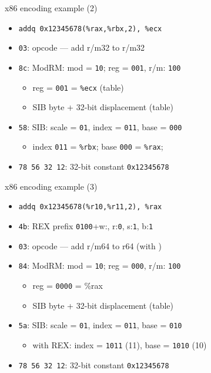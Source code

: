 \begin{frame}[fragile,label=x86ex2]{x86 encoding example (2)}
    \begin{itemize}
    \item \lstinline|addq 0x12345678(%rax,%rbx,2), %ecx|
    \item {\tt 03}: opcode --- add r/m32 to r/m32
    \item {\tt 8c}: ModRM: mod = {\tt 10}; reg = {\tt 001}, r/m: {\tt 100}
        \begin{itemize}
        \item reg = {\tt 001} = {\tt \%ecx} (table)
        \item SIB byte + 32-bit displacement (table)
        \end{itemize}
    \item {\tt 58}: SIB: scale = {\tt 01}, index = {\tt 011}, base = {\tt 000}
        \begin{itemize}
        \item index {\tt 011} = {\tt \%rbx}; base {\tt 000} = {\tt \%rax};
        \end{itemize}
    \item {\tt 78 56 32 12}: 32-bit constant {\tt 0x12345678}
    \end{itemize}
\end{frame}

\begin{frame}[fragile,label=x86ex3]{x86 encoding example (3)}
    \begin{itemize}
    \item \lstinline|addq 0x12345678(%r10,%r11,2), %rax|
    \item {\tt 4b}: REX prefix {\tt 0100}+w:{\tt {}}, r:{\tt \textcolor{orange!80!black}{0}}, s:{\tt \textcolor{blue!80!black}{1}}, b:{\tt \textcolor{green!80!black}{1}}
    \item {\tt 03}: opcode --- add r/m64 to r64 (with )
    \item {\tt 84}: ModRM: mod = {\tt 10}; reg = {\tt 000}, r/m: {\tt 100}
        \begin{itemize}
        \item reg = {\tt \textcolor{orange!80!black}{0}000} = \%rax
        \item SIB byte + 32-bit displacement (table)
        \end{itemize}
    \item {\tt 5a}: SIB: scale = {\tt 01}, index = {\tt 011}, base = {\tt 010}
        \begin{itemize}
        \item with REX: index = {\tt \textcolor{blue!80!black}{1}011} (11), base = {\tt \textcolor{green!80!black}{1}010} (10)
        \end{itemize}
    \item {\tt 78 56 32 12}: 32-bit constant {\tt 0x12345678}
    \end{itemize}
\end{frame}

